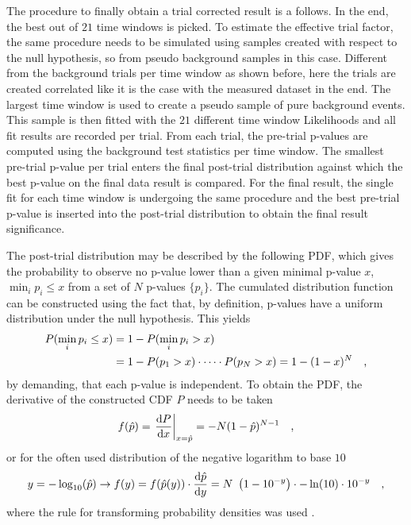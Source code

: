 The procedure to finally obtain a trial corrected result is a follows.
In the end, the best out of $\num{21}$ time windows is picked.
To estimate the effective trial factor, the same procedure needs to be simulated using samples created with respect to the null hypothesis, so from pseudo background samples in this case.
Different from the background trials per time window as shown before, here the trials are created correlated like it is the case with the measured dataset in the end.
The largest time window is used to create a pseudo sample of pure background events.
This sample is then fitted with the $\num{21}$ different time window Likelihoods and all fit results are recorded per trial.
From each trial, the pre-trial p-values are computed using the background test statistics per time window.
The smallest pre-trial p-value per trial enters the final post-trial distribution against which the best p-value on the final data result is compared.
For the final result, the single fit for each time window is undergoing the same procedure and the best pre-trial p-value is inserted into the post-trial distribution to obtain the final result significance.

The post-trial distribution may be described by the following PDF, which gives the probability to observe no p-value lower than a given minimal p-value $x$, $\min_i{p_i} \leq x$ from a set of $N$ p-values $\{p_i\}$.
The cumulated distribution function can be constructed using the fact that, by definition, p-values have a uniform distribution under the null hypothesis.
This yields
\begin{align}
  P(\min_i{p_i} \leq x)
  &= 1 - P(\min_i{p_i} > x) \\
  &= 1 - P(p_1 > x)\cdot\dots\cdot P(p_N > x)
  = 1 - (1-x)^N
  \quad\text{,}
\end{align}
by demanding, that each p-value is independent.
To obtain the PDF, the derivative of the constructed CDF $P$ needs to be taken
\begin{equation}
  f(\hat{p})
  = \left. \frac{\mathrm{d}P}{\mathrm{d}x} \right|_{x=\hat{p}}
  = -N(1 - \hat{p})^{N-1}
  \quad\text{,}
\end{equation}
or for the often used distribution of the negative logarithm to base $\num{10}$
\begin{equation}
  y = -\log_{10}(\hat{p})
  \rightarrow
  f(y) = f(\hat{p}(y))\cdot\dd{\hat{p}}{y}
  = N \left( 1 - 10^{-y} \right) \cdot -\ln(10)\cdot 10^{-y}
  \mcomma
\end{equation}
where the rule for transforming probability densities was used \cite{blobel2013statistische}.


